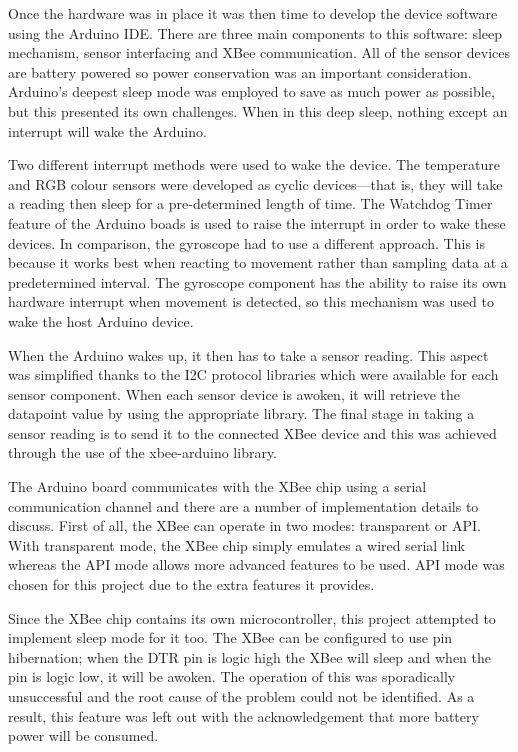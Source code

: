       Once the hardware was in place it was then time to develop the device software using the Arduino IDE. There are three main components to this software: sleep mechanism, sensor interfacing and XBee communication. All of the sensor devices are battery powered so power conservation was an important consideration. Arduino's deepest sleep mode was employed to save as much power as possible, but this presented its own challenges. When in this deep sleep, nothing except an interrupt will wake the Arduino.

      Two different interrupt methods were used to wake the device. The temperature and RGB colour sensors were developed as cyclic devices---that is, they will take a reading then sleep for a pre-determined length of time. The Watchdog Timer feature of the Arduino boads is used to raise the interrupt in order to wake these devices. In comparison, the gyroscope had to use a different approach. This is because it works best when reacting to movement rather than sampling data at a predetermined interval. The gyroscope component has the ability to raise its own hardware interrupt when movement is detected, so this mechanism was used to wake the host Arduino device.

      When the Arduino wakes up, it then has to take a sensor reading. This aspect was simplified thanks to the I2C protocol libraries which were available for each sensor component. When each sensor device is awoken, it will retrieve the datapoint value by using the appropriate library. The final stage in taking a sensor reading is to send it to the connected XBee device and this was achieved through the use of the xbee-arduino library.

      The Arduino board communicates with the XBee chip using a serial communication channel and there are a number of implementation details to discuss. First of all, the XBee can operate in two modes: transparent or API. With transparent mode, the XBee chip simply emulates a wired serial link whereas the API mode allows more advanced features to be used. API mode was chosen for this project due to the extra features it provides.

      Since the XBee chip contains its own microcontroller, this project attempted to implement sleep mode for it too. The XBee can be configured to use pin hibernation; when the DTR pin is logic high the XBee will sleep and when the pin is logic low, it will be awoken. The operation of this was sporadically unsuccessful and the root cause of the problem could not be identified. As a result, this feature was left out with the acknowledgement that more battery power will be consumed.

